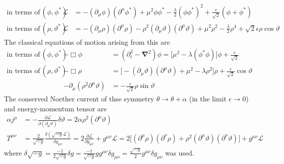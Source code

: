 \begin{subequations}
    \begin{align}
        \text{in terms of}\,(\phi,\phi^*)      &  & \mathscr{L} & =-(\partial_\mu\phi)(\partial^\mu\phi^*)+\mu^2\phi\phi^*-\frac{\lambda}{2}(\phi\phi^*)^2+\frac{\epsilon}{\sqrt{2}}(\phi+\phi^*)                                   \\
        \text{in terms of}\,(\rho,\vartheta^*) &  & \mathscr{L} & =-(\partial_\mu\rho)(\partial^\mu\rho)-\rho^2(\partial_\mu\vartheta)(\partial^\mu\vartheta)+\mu^2\rho^2-\frac{\lambda}{2}\rho^4+\sqrt{2}\epsilon\rho\cos\vartheta
    \end{align}
\end{subequations}
The classical equations of motion arising from this are
\begin{subequations}
    \begin{align}
        \text{in terms of}\,(\phi,\phi^*)      &                                                                                                                           & -\Box\phi                                  & =(\partial_t^2-\mathbf{\nabla}^2)\phi=\big[\mu^2-\lambda(\phi^*\phi)\big]\phi+\frac{\epsilon}{\sqrt{2}} \\
        \text{in terms of}\,(\rho,\vartheta^*) &                                                                                                                           &
        -\Box\rho                              & =\big[-(\partial_\mu\vartheta)(\partial^\mu\vartheta)+\mu^2-\lambda\rho^2\big]\rho+\frac{\epsilon}{\sqrt{2}}\cos\vartheta                                                                                                                                                        \\
                                               &                                                                                                                           & -\partial_\mu(\rho^2\partial^\mu\vartheta) & =-\frac{\epsilon}{\sqrt{2}}\rho\sin\vartheta
    \end{align}
\end{subequations}
The conserved Noether current of thse symmetry $\theta\to\theta+\alpha$ (in the limit $\epsilon\to 0$) and energy-momentum tensor are
\begin{subequations}
    \begin{align}
        \alpha j^\mu & =-\frac{\partial\mathscr{L}}{\partial(\partial_\mu\vartheta)}\delta\vartheta=2\alpha\rho^2(\partial^\mu\vartheta)                                                                                                                                                            \\
        T^{\mu\nu}   & =\frac{2}{\sqrt{-g}}\frac{\delta(\sqrt{-g}\mathscr{L})}{\delta g_{\mu\nu}}=2\frac{\partial\mathscr{L}}{\partial g_{\mu\nu}}+g^{\mu\nu}\mathscr{L}=2\big[(\partial^\mu\rho)(\partial^\nu\rho)+\rho^2(\partial^\mu\vartheta)(\partial^\nu\vartheta)\big]+g^{\mu\nu}\mathscr{L}
    \end{align}
\end{subequations}
where $\delta\sqrt{-g}=\frac{-1}{2\sqrt{-g}}\delta g=\frac{-1}{\sqrt{-g}}gg^{\mu\nu}\delta g_{\mu\nu}=\frac{\sqrt{-g}}{2}g^{\mu\nu}\delta g_{\mu\nu}$ was used.

